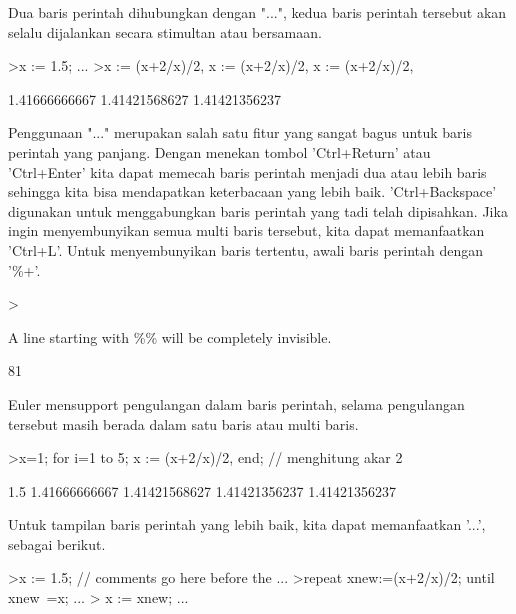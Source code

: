 \documentclass{article}
\begin{document}
\begin{eulernotebook}
\begin{eulercomment}
Dua baris perintah dihubungkan dengan "...", kedua baris perintah
tersebut akan selalu dijalankan secara stimultan atau bersamaan.
\end{eulercomment}
\begin{eulerprompt}
>x := 1.5; ...
>x := (x+2/x)/2, x := (x+2/x)/2, x := (x+2/x)/2, 
\end{eulerprompt}
\begin{euleroutput}
  1.41666666667
  1.41421568627
  1.41421356237
\end{euleroutput}
\begin{eulercomment}
Penggunaan "..." merupakan salah satu fitur yang sangat bagus untuk
baris perintah yang panjang. Dengan menekan tombol 'Ctrl+Return' atau
'Ctrl+Enter' kita dapat memecah baris perintah menjadi dua atau lebih
baris sehingga kita bisa mendapatkan keterbacaan yang lebih baik.
'Ctrl+Backspace' digunakan untuk menggabungkan baris perintah yang
tadi telah dipisahkan. Jika ingin menyembunyikan semua multi baris
tersebut, kita dapat memanfaatkan 'Ctrl+L'. Untuk menyembunyikan baris
tertentu, awali baris perintah dengan '\%+'.
\end{eulercomment}
\begin{eulerprompt}
>%
\end{eulerprompt}
\begin{eulercomment}
A line starting with \%\% will be completely invisible.
\end{eulercomment}
\begin{euleroutput}
  81
\end{euleroutput}
\begin{eulercomment}
Euler mensupport pengulangan dalam baris perintah, selama pengulangan
tersebut masih berada dalam satu baris atau multi baris.
\end{eulercomment}
\begin{eulerprompt}
>x=1; for i=1 to 5; x := (x+2/x)/2, end; // menghitung akar 2
\end{eulerprompt}
\begin{euleroutput}
  1.5
  1.41666666667
  1.41421568627
  1.41421356237
  1.41421356237
\end{euleroutput}
\begin{eulercomment}
Untuk tampilan baris perintah yang lebih baik, kita dapat memanfaatkan
'...', sebagai berikut.
\end{eulercomment}
\begin{eulerprompt}
>x := 1.5; // comments go here before the ...
>repeat xnew:=(x+2/x)/2; until xnew~=x; ...
>   x := xnew; ...

\end{eulerprompt}
\end{eulernotebook}
\end{document}
